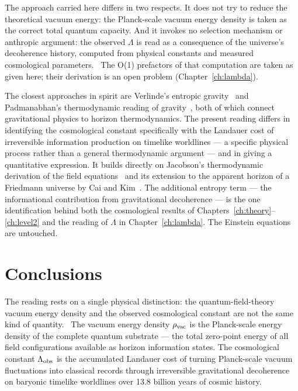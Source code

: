 The approach carried here differs in two respects. It does not try to reduce the theoretical vacuum energy: the Planck-scale vacuum
energy density is taken as the correct total quantum capacity. And it invokes no selection mechanism or anthropic argument: the observed
$\Lambda$ is read as a consequence of the universe's decoherence history, computed from physical constants and measured cosmological
parameters. \interp\ The O(1) prefactors of that computation are taken as given here; their derivation is an open problem (Chapter~\ref{ch:lambda}). \openprob

The closest approaches in spirit are Verlinde's entropic gravity~\cite{Verlinde2011} and Padmanabhan's thermodynamic reading of
gravity~\cite{Padmanabhan2010}, both of which connect gravitational physics to horizon thermodynamics. The present reading differs in
identifying the cosmological constant specifically with the Landauer cost of irreversible information production on timelike
worldlines --- a specific physical process rather than a general thermodynamic argument --- and in giving a quantitative expression.
It builds directly on Jacobson's thermodynamic derivation of the field equations~\cite{Jacobson1995} and its extension to the
apparent horizon of a Friedmann universe by Cai and Kim~\cite{CaiKim2005}. The additional entropy term --- the informational
contribution from gravitational decoherence --- is the one identification behind both the cosmological results of
Chapters~\ref{ch:theory}--\ref{ch:level2} and the reading of $\Lambda$ in Chapter~\ref{ch:lambda}. The Einstein equations are
untouched. \interp

\section{Conclusions}\label{sec:lh_concl}
The reading rests on a single physical distinction: the quantum-field-theory vacuum energy density and the observed cosmological
constant are not the same kind of quantity. \interp\ The vacuum energy density $\rho_{\rm vac}$ is the Planck-scale energy density of
the complete quantum substrate --- the total zero-point energy of all field configurations available as horizon information states. The
cosmological constant $\Lambda_{\rm obs}$ is the accumulated Landauer cost of turning Planck-scale vacuum fluctuations into classical
records through irreversible gravitational decoherence on baryonic timelike worldlines over 13.8 billion years of cosmic history.
\conjecture

